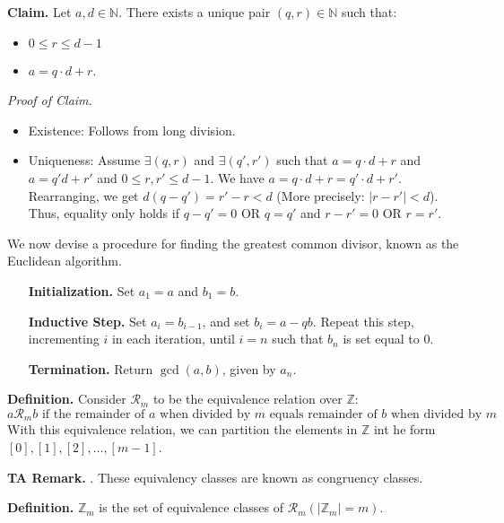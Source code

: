 \documentclass{article}
\begin{document}
    \vspace{1.5mm}
    \textbf{Claim.} Let $a, d \in \mathbb{N}$. There exists a unique pair $(q, r) \in \mathbb{N}$ such that: 
    \begin{itemize}
        \item $0 \le r \le d - 1$
        \item $a = q \cdot d + r$.
    \end{itemize}
    
    \vspace{1.5mm}
    \textit{Proof of Claim. }
    \begin{itemize}
        \item Existence: Follows from long division.
        \item Uniqueness: Assume $\exists(q, r)$ and $\exists(q', r')$ such that $a = q \cdot d + r$ and $a = q'd + r'$ and $0 \le r, r' \le d - 1$. We have $a = q \cdot d + r = q' \cdot d + r'$. Rearranging, we get $d(q - q') = r' - r < d$ (More precisely: $|r - r'| < d$). Thus, equality only holds if $q - q' = 0$ OR $q = q'$ and $r - r' = 0$ OR $r = r'$.
    \end{itemize}
    We now devise a procedure for finding the greatest common divisor, known as the Euclidean algorithm.
    \begin{enumerate}[leftmargin=1.2in]
        \item [\textbf{Initialization.}] Set $a_{1} = a$ and $b_{1} = b$.
        \item [\textbf{Inductive Step.}] Set $a_{i} = b_{i - 1}$, and set $b_{i} = a - qb$. Repeat this step, incrementing $i$ in each iteration, until $i = n$ such that $b_{n}$ is set equal to $0$.
        \item [\textbf{Termination.}] Return $\gcd(a, b)$, given by $a_{n}$.
    \end{enumerate}
    
    \textbf{Definition.} Consider $\mathcal{R}_{m}$ to be the equivalence relation over $\mathbb{Z}$: $$\text{$a \mathcal{R}_{m} b$ if the remainder of $a$ when divided by $m$ equals remainder of $b$ when divided by $m$}.$$ With this equivalence relation, we can partition the elements in $\mathbb{Z}$ int he form $[0], [1], [2],\dots, [m-1]$.
    
    \vspace{1.5mm}
    \textbf{TA Remark. }. These equivalency classes are known as congruency classes.
    
    \vspace{1.5mm}
    \textbf{Definition. } $\mathbb{Z}_{m}$ is the set of equivalence classes of $\mathcal{R}_{m} (|\mathbb{Z}_{m}| = m)$.
    
\end{document}
